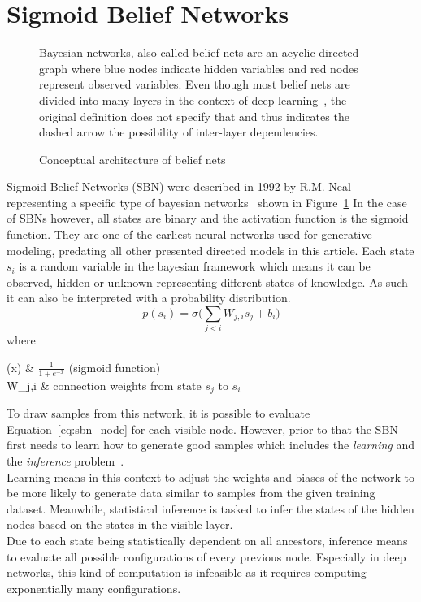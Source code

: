 \section{Sigmoid Belief Networks}
\label{sec:sbn}
\begin{figure}[htb]
\centering

  \caption[Architecture of Sigmoid Belief Nets]{Conceptual architecture of belief nets}
\label{fig:sbn_arch}
  \medskip
  \small
  Bayesian networks, also called belief nets are an acyclic directed graph where blue nodes indicate hidden variables and red nodes represent observed variables.
  Even though most belief nets are divided into many layers in the context of deep learning~\cite[Chapter 20.10.1]{deeplearning:2016}, the original definition does not specify that and thus indicates the dashed arrow the possibility of inter-layer dependencies.
\end{figure}

Sigmoid Belief Networks (SBN) were described in 1992 by R.M. Neal~\cite{neal:1992} representing a specific type of bayesian networks~\cite{pearl:1985} shown in Figure~\ref{fig:sbn_arch}
In the case of SBNs however, all states are binary and the activation function is the sigmoid function. They are one of the earliest neural networks used for generative modeling, predating all other presented directed models in this article.
Each state $s_i$ is a random variable in the bayesian framework which means it can be observed, hidden or unknown representing different states of knowledge. As such it can also be interpreted with a probability distribution.
\begin{equation}
  \label{eq:sbn_node}
p(s_i) = \sigma\bigg(\sum_{j<i}W_{j,i}s_j+b_i\bigg)
\end{equation}
where
\begin{conditions}
  \sigma(x) & $\frac{1}{1 + e^{-x}}$ (sigmoid function)\\
  W_{j,i} & connection weights from state $s_j$ to $s_i$\\
\end{conditions}

To draw samples from this network, it is possible to evaluate Equation~\ref{eq:sbn_node} for each visible node.
However, prior to that the SBN first needs to learn how to generate good samples which includes the \emph{learning} and the \emph{inference} problem~\cite[p.~695]{deeplearning:2016}.\\
Learning means in this context to adjust the weights and biases of the network to be more likely to generate data similar to samples from the given training dataset.
Meanwhile, statistical inference is tasked to infer the states of the hidden nodes based on the states in the visible layer.\\
%
Due to each state being statistically dependent on all ancestors, inference means to evaluate all possible configurations of every previous node.
Especially in deep networks, this kind of computation is infeasible as it requires computing exponentially many configurations.

